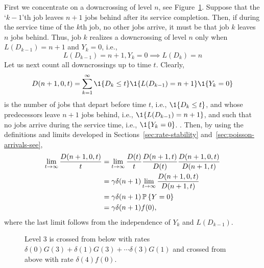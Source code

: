 First we concentrate on a downcrossing of level $n$, see
Figure~\ref{fig:mg1_2}. Suppose that the `$k-1$'th job leaves $n+1$
jobs behind after its service completion. Then, if during the service
time of the $k$th job, no other jobs arrive, it must be that job $k$
leaves $n$ jobs behind. Thus, job $k$ realizes a downcrossing of level
$n$ only when $L(D_{k-1})=n+1$ and $Y_k=0$, i.e.,
\begin{equation*}
  L(D_{k-1})=n+1, Y_k = 0 \implies L(D_k) = n
\end{equation*}
Let us next count all  downcrossings up to time $t$. Clearly, 
\begin{equation*}
  D(n+1, 0, t) = \sum_{k=1}^\infty \1{D_{k}\leq t}\1{L(D_{k-1})=n+1}\1{Y_k=0}
\end{equation*}
is the number of jobs that depart before time $t$, i.e.,
$\1{D_k\leq t}$, and whose predecessors leave $n+1$ jobs behind, i.e.,
$\1{L(D_{k-1})=n+1}$, and such that no jobs arrive during the service
time, i.e., $\1{Y_k=0}$. . Then, by using the definitions and limits
developed in Sections~\ref{sec:rate-stability}
and~\ref{sec:poisson-arrivals-see},
\begin{equation*}
  \begin{split}
  \lim_{t\to\infty} \frac{  D(n+1, 0, t)}t 
&=   \lim_{t\to\infty}  \frac{D(t)}t \frac{D(n+1, t)}{D(t)}\frac{ D(n+1, 0, t)}{D(n+1,t)} \\
&=   \gamma \delta(n+1) \lim_{t\to\infty} \frac{ D(n+1, 0, t)}{D(n+1,t)} \\
&=   \gamma \delta(n+1) \P{Y=0}\\
& = \gamma \delta(n+1) f(0),
  \end{split}
\end{equation*}
where the last limit follows from the independence of $Y_k$ and $L(D_{k-1})$. 

\begin{figure}[htb]
  \centering
                  
\caption{Level $3$ is crossed from below with rates
  $\delta(0)G(3) + \delta(1)G(3) + \cdots \delta(3) G(1)$ and crossed
  from above with rate $\delta(4) f(0)$. }
\label{fig:mg1_2}
\end{figure}


